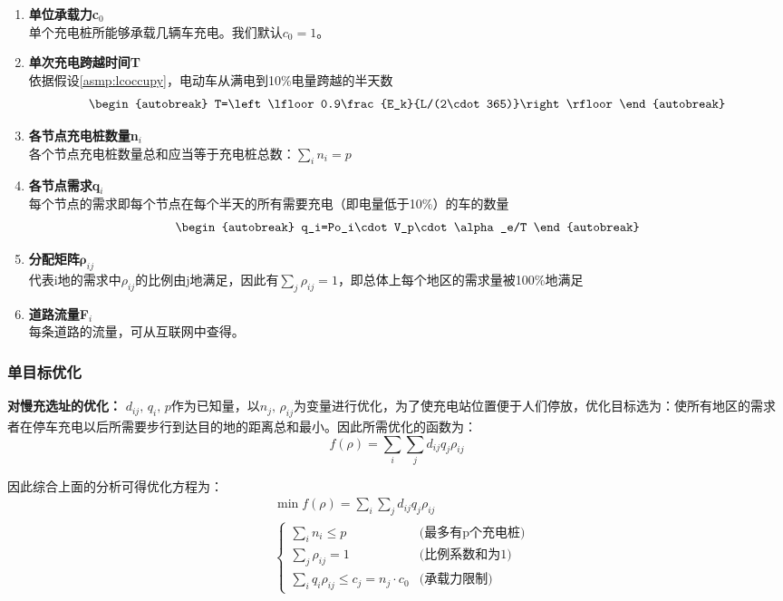 \documentclass[12pt, a4paper, oneside]{ctexart}
\begin{document}
\begin{enumerate}[label = \alph*)]
    \item \textbf{单位承载力c\(_0\)}\\
          单个充电桩所能够承载几辆车充电。我们默认\(c_0=1\)。
    \item \textbf{单次充电跨越时间T}\\
          依据假设\ref{asmp:lcoccupy}，电动车从满电到10\%电量跨越的半天数\begin{align}\begin{autobreak}
                  T=\left\lfloor 0.9\frac{E_k}{L/(2\cdot 365)}\right\rfloor
              \end{autobreak}\end{align}
    \item \textbf{各节点充电桩数量n\(_i\)}\\
          各个节点充电桩数量总和应当等于充电桩总数：\(\sum\limits_i n_i=p \)
    \item \textbf{各节点需求q\(_i\)}\\
          每个节点的需求即每个节点在每个半天的所有需要充电（即电量低于10\%）的车的数量\begin{align}\begin{autobreak}
                  q_i=Po_i\cdot V_p\cdot\alpha_e/T
              \end{autobreak}\end{align}
    \item \textbf{分配矩阵\(\boldsymbol{\rho}_{ij}\)}\\
          代表i地的需求中\(\rho_{ij}\)的比例由j地满足，因此有\(\sum\limits_j \rho_{ij}=1\)，即总体上每个地区的需求量被100\%地满足
    \item \textbf{道路流量F\(_i\)}\\
          每条道路的流量，可从互联网中查得。
\end{enumerate}
\subsubsection{单目标优化}
\textbf{对慢充选址的优化：}
\(d_{ij},\,q_i,\,p\)作为已知量，以\(n_j,\,\rho_{ij}\)为变量进行优化，为了使充电站位置便于人们停放，优化目标选为：使所有地区的需求者在停车充电以后所需要步行到达目的地的距离总和最小。因此所需优化的函数为：
\begin{dmath}
    f(\rho)=\sum_i \sum_jd_{ij} q_j \rho_{ij}
\end{dmath}

因此综合上面的分析可得优化方程为：
\begin{align*}
     & \min  f(\rho)=\sum_i \sum_jd_{ij} q_j \rho_{ij} \\
     & \begin{cases}
        \sum\limits_i n_i\leqslant p                                     & \text{(最多有p个充电桩)} \\
        \sum\limits_j \rho_{ij}=1                               & \text{(比例系数和为1)} \\
        \sum\limits_i q_{i}\rho_{ij}\leqslant c_j=n_j \cdot c_0 & \text{(承载力限制)}
    \end{cases}
\end{align*}
\end{document}
